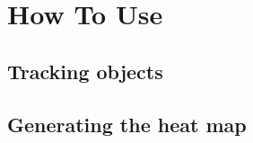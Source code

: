 \section{How To Use}
\label{HowToUse}

\subsection{Tracking objects}
\label{HowToUse_Tracking}

\subsection{Generating the heat map}
\label{HowToUse_Generating}